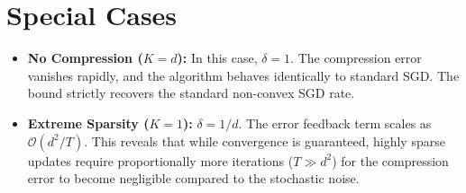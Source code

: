 \documentclass{article}
\begin{document}
\section*{Special Cases}
\begin{itemize}
    \item \textbf{No Compression ($K=d$):} In this case, $\delta = 1$. The compression error vanishes rapidly, and the algorithm behaves identically to standard SGD. The bound strictly recovers the standard non-convex SGD rate.
    \item \textbf{Extreme Sparsity ($K=1$):} $\delta = 1/d$. The error feedback term scales as $\mathcal{O}(d^2 / T)$. This reveals that while convergence is guaranteed, highly sparse updates require proportionally more iterations ($T \gg d^2$) for the compression error to become negligible compared to the stochastic noise.
\end{itemize}
\end{document}
